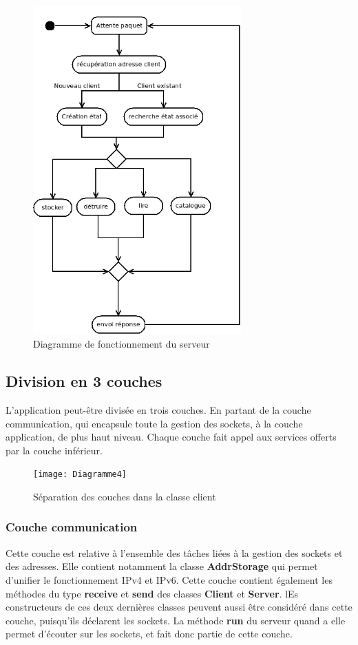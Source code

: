 \documentclass[10pt,a4paper]{article}
\begin{document}
\begin{figure}[H]
 \centering
 \includegraphics[width=8cm]{Diagramme3}
 \caption{Diagramme de fonctionnement du serveur}
\end{figure}

\subsection{Division en 3 couches}
L'application peut-être divisée en trois couches. En partant de la couche communication, qui encapsule toute la gestion des sockets, à la couche application, de plus haut niveau.
Chaque couche fait appel aux services offerts par la couche inférieur.
\begin{figure}[H]
 \centering
 \texttt{[image: Diagramme4]}
 \caption{Séparation des couches dans la classe client}
\end{figure}
\subsubsection{Couche communication} \label{sec:communication}
Cette couche est relative à l'ensemble des tâches liées à la gestion des sockets et des adresses. Elle contient notamment la classe \textbf{AddrStorage} qui permet d'unifier le fonctionnement IPv4 et IPv6.
Cette couche contient également les méthodes du type \textbf{receive} et \textbf{send} des classes \textbf{Client} et \textbf{Server}. lEs constructeurs de ces deux dernières classes peuvent aussi être considéré dans cette couche, puisqu'ils déclarent les sockets. La méthode \textbf{run} du serveur quand a elle permet d'écouter sur les sockets, et fait donc partie de cette couche.
\end{document}

